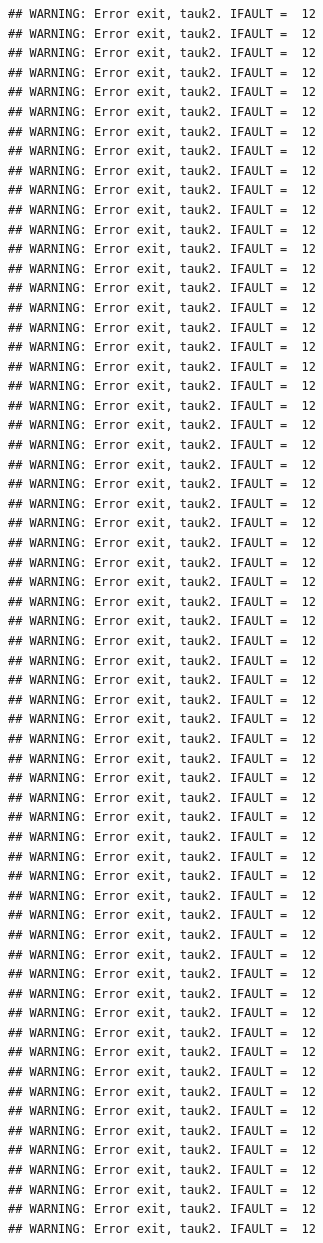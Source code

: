 \documentclass[
  12pt,
]{article}
\begin{document}
\begin{verbatim}
## WARNING: Error exit, tauk2. IFAULT =  12
## WARNING: Error exit, tauk2. IFAULT =  12
## WARNING: Error exit, tauk2. IFAULT =  12
## WARNING: Error exit, tauk2. IFAULT =  12
## WARNING: Error exit, tauk2. IFAULT =  12
## WARNING: Error exit, tauk2. IFAULT =  12
## WARNING: Error exit, tauk2. IFAULT =  12
## WARNING: Error exit, tauk2. IFAULT =  12
## WARNING: Error exit, tauk2. IFAULT =  12
## WARNING: Error exit, tauk2. IFAULT =  12
## WARNING: Error exit, tauk2. IFAULT =  12
## WARNING: Error exit, tauk2. IFAULT =  12
## WARNING: Error exit, tauk2. IFAULT =  12
## WARNING: Error exit, tauk2. IFAULT =  12
## WARNING: Error exit, tauk2. IFAULT =  12
## WARNING: Error exit, tauk2. IFAULT =  12
## WARNING: Error exit, tauk2. IFAULT =  12
## WARNING: Error exit, tauk2. IFAULT =  12
## WARNING: Error exit, tauk2. IFAULT =  12
## WARNING: Error exit, tauk2. IFAULT =  12
## WARNING: Error exit, tauk2. IFAULT =  12
## WARNING: Error exit, tauk2. IFAULT =  12
## WARNING: Error exit, tauk2. IFAULT =  12
## WARNING: Error exit, tauk2. IFAULT =  12
## WARNING: Error exit, tauk2. IFAULT =  12
## WARNING: Error exit, tauk2. IFAULT =  12
## WARNING: Error exit, tauk2. IFAULT =  12
## WARNING: Error exit, tauk2. IFAULT =  12
## WARNING: Error exit, tauk2. IFAULT =  12
## WARNING: Error exit, tauk2. IFAULT =  12
## WARNING: Error exit, tauk2. IFAULT =  12
## WARNING: Error exit, tauk2. IFAULT =  12
## WARNING: Error exit, tauk2. IFAULT =  12
## WARNING: Error exit, tauk2. IFAULT =  12
## WARNING: Error exit, tauk2. IFAULT =  12
## WARNING: Error exit, tauk2. IFAULT =  12
## WARNING: Error exit, tauk2. IFAULT =  12
## WARNING: Error exit, tauk2. IFAULT =  12
## WARNING: Error exit, tauk2. IFAULT =  12
## WARNING: Error exit, tauk2. IFAULT =  12
## WARNING: Error exit, tauk2. IFAULT =  12
## WARNING: Error exit, tauk2. IFAULT =  12
## WARNING: Error exit, tauk2. IFAULT =  12
## WARNING: Error exit, tauk2. IFAULT =  12
## WARNING: Error exit, tauk2. IFAULT =  12
## WARNING: Error exit, tauk2. IFAULT =  12
## WARNING: Error exit, tauk2. IFAULT =  12
## WARNING: Error exit, tauk2. IFAULT =  12
## WARNING: Error exit, tauk2. IFAULT =  12
## WARNING: Error exit, tauk2. IFAULT =  12
## WARNING: Error exit, tauk2. IFAULT =  12
## WARNING: Error exit, tauk2. IFAULT =  12
## WARNING: Error exit, tauk2. IFAULT =  12
## WARNING: Error exit, tauk2. IFAULT =  12
## WARNING: Error exit, tauk2. IFAULT =  12
## WARNING: Error exit, tauk2. IFAULT =  12
## WARNING: Error exit, tauk2. IFAULT =  12
## WARNING: Error exit, tauk2. IFAULT =  12
## WARNING: Error exit, tauk2. IFAULT =  12
## WARNING: Error exit, tauk2. IFAULT =  12
## WARNING: Error exit, tauk2. IFAULT =  12
## WARNING: Error exit, tauk2. IFAULT =  12
## WARNING: Error exit, tauk2. IFAULT =  12
\end{verbatim}
\end{document}
